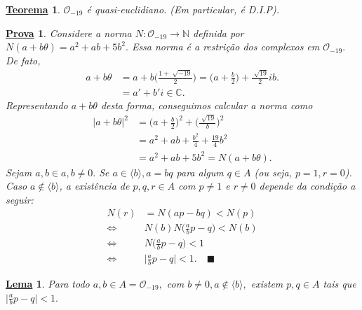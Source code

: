 \documentclass{article}
\newtheorem*{theorem*}{\underline{Teorema}}
\newtheorem*{lemma*}{\underline{Lema}}
\newtheorem*{proof*}{\underline{Prova}}
\renewcommand\qedsymbol{$\blacksquare$}
\begin{document}
\begin{theorem*}
  \(\mathcal{O}_{-19}\) é quasi-euclidiano. (Em particular, é D.I.P).
\end{theorem*}
\begin{proof*}
  Considere a norma \(N:\mathcal{O}_{-19}\rightarrow \mathbb{N}\) definida por \(N(a+b\theta ) = a^{2} + ab + 5b^{2}.\) Essa norma é a
restrição dos complexos em \(\mathcal{O}_{-19}.\) De fato,
\begin{align*}
  a + b\theta &= a +b \biggl(\frac{1+\sqrt[]{-19}}{2}\biggr) = \biggl(a + \frac{b}{2}\biggr) + \frac{\sqrt[]{19}}{2}ib.\\
              &= a' + b'i\in \mathbb{C}.
\end{align*}
  Representando \(a + b\theta \) desta forma, conseguimos calcular a norma como 
 \begin{align*}
   |a+b\theta |^{2} &= \biggl(a + \frac{b}{2}\biggr)^{2} + \biggl(\frac{\sqrt[]{19}}{b}\biggr)^{2}\\
                    &= a^{2} + ab + \frac{b^{2}}{4} + \frac{19}{4}b^{2}\\
                    &= a^{2} + ab + 5b^{2} = N(a + b\theta ).
 \end{align*}
 Sejam \(a, b\in a, b\neq0.\) Se \(a\in \langle b \rangle, a = bq\) para algum \(q\in A\) (ou seja, \(p=1, r = 0\)).
Caso \(a\not\in \langle b \rangle\), a existência de \(p, q, r\in A\) com \(p\neq 1\) e \(r\neq 0\) depende da condição 
a seguir:
\begin{align*}
  N(r) &= N(ap-bq) < N(p)\\
      \Longleftrightarrow & N(b)N \biggl(\frac{a}{b}p - q\biggr) < N(b)\\
      \Longleftrightarrow & N \biggl(\frac{a}{b}p - q\biggr) < 1\\
      \Longleftrightarrow & \biggl|\frac{a}{b}p - q\biggr| < 1. \quad\text{\qedsymbol}
\end{align*} 
\end{proof*}
\begin{lemma*}
  Para todo \(a, b\in A = \mathcal{O}_{-19},\) com \(b\neq0, a\not\in \langle b \rangle,\) existem \(p, q\in A\) tais que 
 \(\biggl|\frac{a}{b}p - q\biggr| < 1.\)
\end{lemma*}
\end{document}
